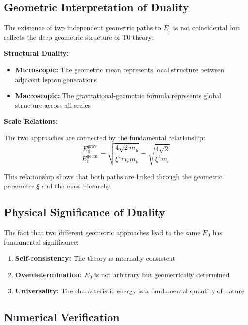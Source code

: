 \documentclass[12pt,a4paper]{article}
\begin{document}
	\subsection{Geometric Interpretation of Duality}
	
	The existence of two independent geometric paths to $E_0$ is not coincidental but reflects the deep geometric structure of T0-theory:
	
	\textbf{Structural Duality:}
	\begin{itemize}
		\item \textbf{Microscopic:} The geometric mean represents local structure between adjacent lepton generations
		\item \textbf{Macroscopic:} The gravitational-geometric formula represents global structure across all scales
	\end{itemize}
	
	\textbf{Scale Relations:}
	
	The two approaches are connected by the fundamental relationship:
	\begin{equation}
		\frac{E_0^{\text{grav}}}{E_0^{\text{geom}}} = \sqrt{\frac{4\sqrt{2} m_\mu}{\xi^4 m_e m_\mu}} = \sqrt{\frac{4\sqrt{2}}{\xi^4 m_e}}
	\end{equation}
	
	This relationship shows that both paths are linked through the geometric parameter $\xi$ and the mass hierarchy.
	
	\subsection{Physical Significance of Duality}
	
	The fact that two different geometric approaches lead to the same $E_0$ has fundamental significance:
	
	\begin{enumerate}
		\item \textbf{Self-consistency:} The theory is internally consistent
		\item \textbf{Overdetermination:} $E_0$ is not arbitrary but geometrically determined
		\item \textbf{Universality:} The characteristic energy is a fundamental quantity of nature
	\end{enumerate}
	
	\subsection{Numerical Verification}
	
\end{document}
